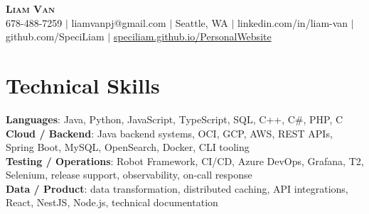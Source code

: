 \documentclass[letterpaper,11pt]{article}
\begin{document}

%
\begin{center}
    \textbf{\Huge \scshape Liam Van} \\ \vspace{1pt}
    \small 678-488-7259 $|$ \small {liamvanpj@gmail.com} $|$ Seattle, WA
 {{$|$ linkedin.com/in/liam-van} {$|$ github.com/SpeciLiam} {$|$ \href{https://speciliam.github.io/PersonalWebsite}{speciliam.github.io/PersonalWebsite}}}

\end{center}

\section{Technical Skills}
 \begin{itemize}[leftmargin=0.15in, label={}]
    \small{\item{
     \textbf{Languages}{: Java, Python, JavaScript, TypeScript, SQL, C++, C\#, PHP, C} \\
     \textbf{Cloud / Backend}{: Java backend systems, OCI, GCP, AWS, REST APIs, Spring Boot, MySQL, OpenSearch, Docker, CLI tooling} \\
     \textbf{Testing / Operations}{: Robot Framework, CI/CD, Azure DevOps, Grafana, T2, Selenium, release support, observability, on-call response} \\
     \textbf{Data / Product}{: data transformation, distributed caching, API integrations, React, NestJS, Node.js, technical documentation} \\
    }}
 \end{itemize}
%
\end{document}
